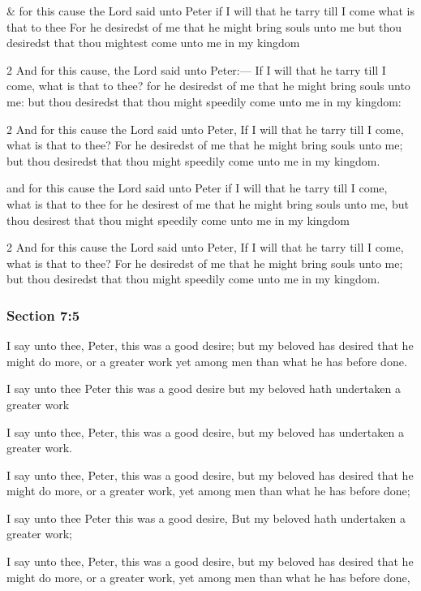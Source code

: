		\begin{framed}
		\scriptsize
			\begin{compactdesc}
				\item[JSP] \& for this cause the Lord said unto Peter if I will that he tarry till I come what is that to thee For he desiredst of me that he might bring souls unto me but thou desiredst that thou mightest come unto me in my kingdom
				\item[BC] 2 And for this cause, the Lord said unto Peter:--- If I will that he tarry till I come, what is that to thee? for he desiredst of me that he might bring souls unto me: but thou desiredst that thou might speedily come unto me in my kingdom:
				\item[DC 1835] 2 And for this cause the Lord said unto Peter, If I will that he tarry till I come, what is that to thee? For he desiredst of me that he might bring souls unto me; but thou desiredst that thou might speedily come unto me in my kingdom. 
				\item[FGW] and for this cause the Lord said unto Peter if I will that he tarry till I come, what is that to thee for he desirest of me that he might bring souls unto me, but thou desirest that thou might speedily come unto me in my kingdom 
				\item[DC 1844] 2 And for this cause the Lord said unto Peter, If I will that he tarry till I come, what is that to thee? For he desiredst of me that he might bring souls unto me; but thou desiredst that thou might speedily come unto me in my kingdom.
			\end{compactdesc}
		\end{framed}

	\subsubsection{Section 7:5} %
		\label{DC7-5}

		I say unto thee, Peter, this was a good desire; but my beloved has desired that he might do more, or a greater work yet among men than what he has before done.

		\begin{framed}
		\scriptsize
			\begin{compactdesc}
				\item[JSP] I say unto thee Peter this was a good desire but my beloved hath undertaken a greater work
				\item[BC] I say unto thee, Peter, this was a good desire, but my beloved has undertaken a greater work.
				\item[DC 1835] I say unto thee, Peter, this was a good desire, but my beloved has desired that he might do more, or a greater work, yet among men than what he has before done;
				\item[FGW] I say unto thee Peter this was a good desire, But my beloved hath undertaken a greater work; 
				\item[DC 1844] I say unto thee, Peter, this was a good desire, but my beloved has desired that he might do more, or a greater work, yet among men than what he has before done, 
			\end{compactdesc}
		\end{framed}

